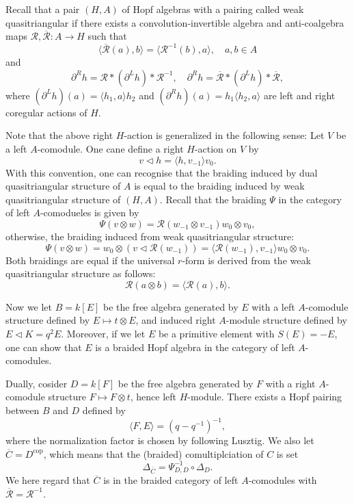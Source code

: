 Recall that a pair $(H,A)$ of Hopf algebras with a pairing called weak quasitriangular if there exists a convolution-invertible algebra and anti-coalgebra maps $\mathscr{R}, \overline{\mathscr{R}}: A \rightarrow H$ such that
\[
\langle \overline{\mathscr{R}}(a), b \rangle = \langle \mathscr{R}^{-1}(b), a \rangle, \quad a, b \in A
\]
and
\[
\partial^R h = \mathscr{R} * (\partial^L h) * \mathscr{R}^{-1}, \quad \partial^R h = \overline{\mathscr{R}} * (\partial^L h) * \overline{\mathscr{R}}, 
\]
where $(\partial^L h)(a) = \langle h_1, a \rangle h_2$ and $(\partial^R h)(a) = h_1 \langle h_2, a \rangle$ are left and right coregular actions of $H$.

Note that the above right $H$-action is generalized in the following sense:
Let $V$ be a left $A$-comodule.
One cane define a right $H$-action on $V$ by
\[
    v \triangleleft h = \langle h, v_{-1} \rangle v_0.
\]
With this convention, one can recognise that the braiding induced by dual quasitriangular structure of $A$ is equal to the braiding induced by weak quasitriangular structure of $(H, A)$.
Recall that the braiding $\Psi$ in the category of left $A$-comodueles is given by
\[
    \Psi(v \otimes w) = \mathscr{R}(w_{-1} \otimes v_{-1}) w_0 \otimes v_0,
\]
otherwise, the braiding induced from weak quasitriangular structure:
\[
    \Psi(v \otimes w) = w_0 \otimes (v \triangleleft \mathscr{R}(w_{-1})) = \langle \mathscr{R}(w_{-1}), v_{-1} \rangle w_0 \otimes v_0 .
\]
Both braidings are equal if the universal $r$-form is derived from the weak quasitriangular structure as follows:
\[
    \mathscr{R}(a \otimes b) = \langle \mathscr{R}(a), b \rangle.
\]

Now we let $B = k[E]$ be the free algebra generated by $E$ with a left $A$-comodule structure defined by $E \mapsto t \otimes E$, and induced right $A$-module structure defined by $E \triangleleft K = q^2 E$.
Moreover, if we let $E$ be a primitive element with $S(E) = -E$, one can show that $E$ is a braided Hopf algebra in the category of left $A$-comodules.

Dually, cosider $D = k[F]$ be the free algebra generated by $F$ with a right $A$-comodule structure $F \mapsto F \otimes t$, hence left $H$-module.
There exists a Hopf pairing between $B$ and $D$ defined by
\[
    \langle F, E \rangle = (q - q^{-1})^{-1},
\]
where the normalization factor is chosen by following Lusztig.
We also let $\overline{C} = D^{\text{cop}}$, which means that the (braided) comultiplciation of $C$ is set
\[
\Delta_{\overline{C}} = \Psi^{-1}_{D, D} \circ \Delta_D.
\]
We here regard that $\overline{C}$ is in the braided category of left $A$-comodules with $\overline{\mathscr{R}} = \mathscr{R}^{-1}$.

